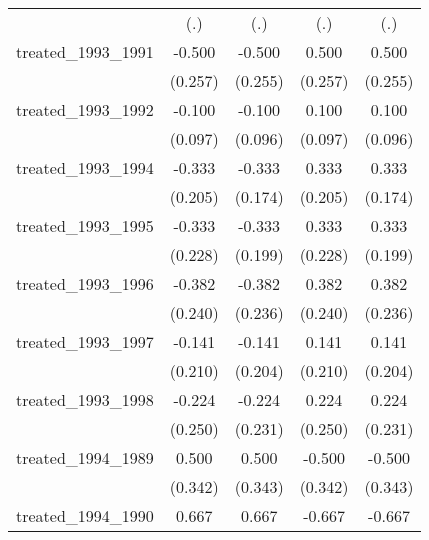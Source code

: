 {\begin{tabular}{l*{4}{c}}
            &         (.)         &         (.)         &         (.)         &         (.)         \\
[1em]
treated\_1993\_1991&      -0.500         &      -0.500\sym{*}  &       0.500         &       0.500\sym{*}  \\
            &     (0.257)         &     (0.255)         &     (0.257)         &     (0.255)         \\
[1em]
treated\_1993\_1992&      -0.100         &      -0.100         &       0.100         &       0.100         \\
            &     (0.097)         &     (0.096)         &     (0.097)         &     (0.096)         \\
[1em]
treated\_1993\_1994&      -0.333         &      -0.333         &       0.333         &       0.333         \\
            &     (0.205)         &     (0.174)         &     (0.205)         &     (0.174)         \\
[1em]
treated\_1993\_1995&      -0.333         &      -0.333         &       0.333         &       0.333         \\
            &     (0.228)         &     (0.199)         &     (0.228)         &     (0.199)         \\
[1em]
treated\_1993\_1996&      -0.382         &      -0.382         &       0.382         &       0.382         \\
            &     (0.240)         &     (0.236)         &     (0.240)         &     (0.236)         \\
[1em]
treated\_1993\_1997&      -0.141         &      -0.141         &       0.141         &       0.141         \\
            &     (0.210)         &     (0.204)         &     (0.210)         &     (0.204)         \\
[1em]
treated\_1993\_1998&      -0.224         &      -0.224         &       0.224         &       0.224         \\
            &     (0.250)         &     (0.231)         &     (0.250)         &     (0.231)         \\
[1em]
treated\_1994\_1989&       0.500         &       0.500         &      -0.500         &      -0.500         \\
            &     (0.342)         &     (0.343)         &     (0.342)         &     (0.343)         \\
[1em]
treated\_1994\_1990&       0.667\sym{*}  &       0.667\sym{*}  &      -0.667\sym{*}  &      -0.667\sym{*}  \\

\end{tabular}}
